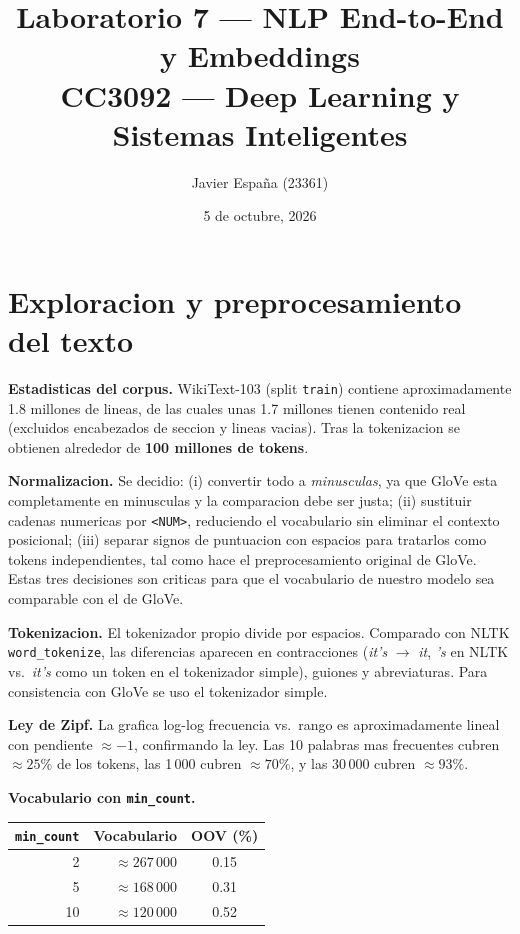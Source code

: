 \documentclass[11pt,a4paper]{article}
\title{\textbf{Laboratorio 7 --- NLP End-to-End y Embeddings}\\
\large CC3092 --- Deep Learning y Sistemas Inteligentes}
\author{Javier Espa\~na (23361)}
\date{5 de octubre, 2026}
\begin{document}
\maketitle
\vspace{-1em}

\section{Exploracion y preprocesamiento del texto}

\textbf{Estadisticas del corpus.} WikiText-103 (split \texttt{train}) contiene
aproximadamente 1.8 millones de lineas, de las cuales unas 1.7 millones tienen
contenido real (excluidos encabezados de seccion y lineas vacias).
Tras la tokenizacion se obtienen alrededor de \textbf{100 millones de tokens}.

\textbf{Normalizacion.} Se decidio: (i) convertir todo a \emph{minusculas}, ya
que GloVe esta completamente en minusculas y la comparacion debe ser justa;
(ii) sustituir cadenas numericas por \texttt{<NUM>}, reduciendo el vocabulario
sin eliminar el contexto posicional; (iii) separar signos de puntuacion con
espacios para tratarlos como tokens independientes, tal como hace el preprocesamiento
original de GloVe. Estas tres decisiones son criticas para que el vocabulario
de nuestro modelo sea comparable con el de GloVe.

\textbf{Tokenizacion.} El tokenizador propio divide por espacios. Comparado con
NLTK \texttt{word\_tokenize}, las diferencias aparecen en contracciones
(\textit{it's} $\to$ \textit{it}, \textit{'s} en NLTK vs.\ \textit{it's} como
un token en el tokenizador simple), guiones y abreviaturas. Para consistencia
con GloVe se uso el tokenizador simple.

\textbf{Ley de Zipf.} La grafica log-log frecuencia vs.\ rango es
aproximadamente lineal con pendiente $\approx -1$, confirmando la ley.
Las 10 palabras mas frecuentes cubren $\approx 25\%$ de los tokens,
las 1\,000 cubren $\approx 70\%$, y las 30\,000 cubren $\approx 93\%$.

\textbf{Vocabulario con \texttt{min\_count}.}

\begin{center}
\small
\begin{tabular}{rrc}
\toprule
\texttt{min\_count} & Vocabulario & OOV (\%) \\
\midrule
2  & $\approx 267\,000$ & 0.15 \\
5  & $\approx 168\,000$ & 0.31 \\
10 & $\approx 120\,000$ & 0.52 \\
\bottomrule
\end{tabular}
\end{center}
\end{document}
